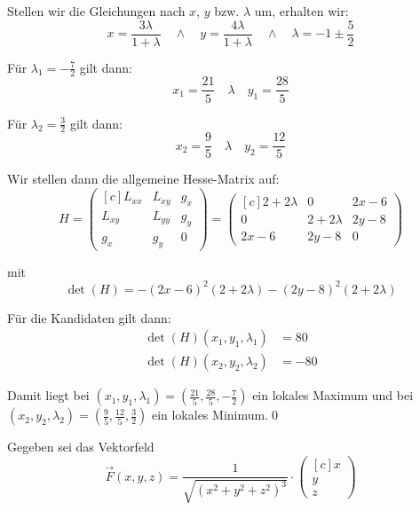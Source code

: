 \documentclass[answers]{exam}
\newcommand{\vektor}[1]{\begin{pmatrix*}[c] #1 \end{pmatrix*}}
\begin{document}
\begin{questions}
\begin{solution}
        Stellen wir die Gleichungen nach $x$, $y$ bzw. $\lambda$ um, erhalten wir:
        $$
            x = \frac{3\lambda}{1+\lambda} \quad \land \quad y = \frac{4\lambda}{1+\lambda} \quad \land \quad \lambda = -1 \pm \frac{5}{2}
        $$

        Für $\lambda_1 = -\frac{7}{2}$ gilt dann:
        $$
            x_1 = \frac{21}{5} \quad \lambda \quad y_1 = \frac{28}{5}
        $$

        Für $\lambda_2 = \frac{3}{2}$ gilt dann:
        $$
            x_2 = \frac{9}{5} \quad \lambda \quad y_2 = \frac{12}{5}
        $$

        Wir stellen dann die allgemeine Hesse-Matrix auf:
        $$
            H = \vektor{L_{xx} & L_{xy} & g_x \\ L_{xy} & L_{yy} & g_y \\ g_x & g_y & 0} = \vektor{2 + 2\lambda & 0 & 2x-6 \\ 0 & 2+2\lambda & 2y-8 \\ 2x-6 & 2y-8 & 0}
        $$

        mit
        $$
            \det(H) = -(2x-6)^2(2+2\lambda) - (2y-8)^2(2+2\lambda)
        $$

        Für die Kandidaten gilt dann:
        $$
            \begin{aligned}
                \det(H)(x_1, y_1, \lambda_1) & = 80  \\
                \det(H)(x_2, y_2, \lambda_2) & = -80
            \end{aligned}
        $$

        Damit liegt bei $(x_1, y_1, \lambda_1) = \left( \frac{21}{5}, \frac{28}{5}, -\frac{7}{2} \right)$ ein lokales Maximum und bei $(x_2, y_2, \lambda_2) = \left( \frac{9}{5}, \frac{12}{5}, \frac{3}{2} \right)$ ein lokales Minimum.\qed
    \end{solution}

    \newpage
    \question
    Gegeben sei das Vektorfeld
    $$
        \vec{F}(x, y, z) = \frac{1}{\sqrt{(x^2+y^2+z^2)^3}} \cdot \vektor{x\\y\\z}
    $$
    \begin{parts}

\end{parts}
\end{questions}
\end{document}
